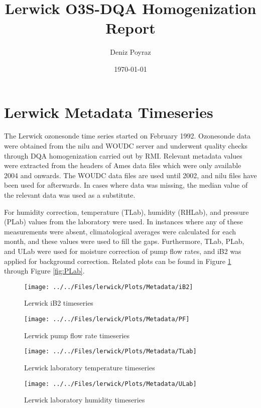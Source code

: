 \documentclass{article}
\title{Lerwick O3S-DQA Homogenization Report}
\author{Deniz Poyraz}
\date{\today}
\begin{document}
\maketitle

\section{Lerwick Metadata Timeseries}
\label{sec:metadata}

The Lerwick ozonesonde time series started on February 1992.
Ozonesonde data were obtained from the nilu and WOUDC server and underwent quality checks through DQA homogenization
carried out by RMI. Relevant metadata values were extracted from the headers of Ames data files which were only available
2004 and onwards. The WOUDC data files are used until 2002, and nilu files have been used for afterwards. 
In cases where data was missing, the median value of the relevant data was used as a substitute.

For humidity correction, temperature (TLab), humidity (RHLab), and pressure (PLab) values from the laboratory were used.
In instances where any of these measurements were absent, climatological averages were calculated for each month,
and these values were used to fill the gaps.
Furthermore, TLab, PLab, and ULab were used for moisture correction of pump flow rates, and iB2 was applied for
background correction. Related plots can be found in Figure \ref{fig:iB2} through Figure \ref{fig:PLab}.




\begin{figure}
\centering
\texttt{[image: ../../Files/lerwick/Plots/Metadata/iB2]}
\caption{Lerwick iB2 timeseries}
\label{fig:iB2}
\end{figure}

\begin{figure}
\centering
\texttt{[image: ../../Files/lerwick/Plots/Metadata/PF]}
\caption{Lerwick pump flow rate timeseries}
\label{fig:PF}
\end{figure}



\begin{figure}
\centering
\texttt{[image: ../../Files/lerwick/Plots/Metadata/TLab]}
\caption{Lerwick laboratory temperature timeseries}
\label{fig:TLab}
\end{figure}

\begin{figure}
\centering
\texttt{[image: ../../Files/lerwick/Plots/Metadata/ULab]}
\caption{Lerwick laboratory humidity timeseries}
\label{fig:ULab}
\end{figure}
\end{document}
